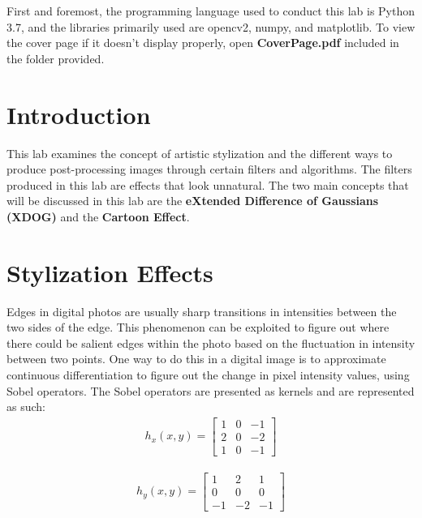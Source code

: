 \documentclass{article}
\begin{document}
	
	
	
	First and foremost, the programming language used to conduct this lab is Python 3.7, and the libraries primarily used are opencv2, numpy, and matplotlib. To view the cover page if it doesn't display properly, open \textbf{CoverPage.pdf} included in the folder provided.\\
	
	\section{Introduction}
	
	This lab examines the concept of artistic stylization and the different ways to produce post-processing images through certain filters and algorithms. The filters produced in this lab are effects that look unnatural. The two main concepts that will be discussed in this lab are the \textbf{eXtended Difference of Gaussians (XDOG)} and the \textbf{Cartoon Effect}.\\
	
	\section{Stylization Effects}
	
	Edges in digital photos are usually sharp transitions in intensities between the two sides of the edge. This phenomenon can be exploited to figure out where there could be salient edges within the photo based on the fluctuation in intensity between two points. One way to do this in a digital image is to approximate continuous differentiation to figure out the change in pixel intensity values, using Sobel operators. The Sobel operators are presented as kernels and are represented as such:\\
	
	\begin{align*}
	 h_{x}(x,y) = \left[
	 \begin{matrix}
	 	1 & 0 & -1\\
	 	2 & 0 & -2\\
	 	1 & 0 & -1
	 \end{matrix}
	 \right]
	\end{align*}
	
	\begin{align*}
		h_{y}(x,y) = \left[
		\begin{matrix}
			 1 & 2 & 1\\
			 0 & 0 & 0\\
			-1 & -2 & -1
		\end{matrix}
		\right]
	\end{align*}
	
\end{document}
